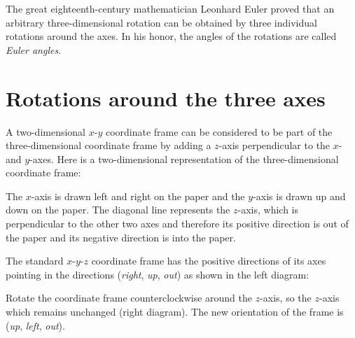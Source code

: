 \documentclass[11pt,a4paper]{report}
\begin{document}
The great eighteenth-century mathematician Leonhard Euler proved that an arbitrary three-dimensional rotation can be obtained by three individual rotations around the axes. In his honor, the angles of the rotations are called \emph{Euler angles}. 

\section{Rotations around the three axes}

A two-dimensional $x$-$y$ coordinate frame can be considered to be part of the three-dimensional coordinate frame by adding a $z$-axis perpendicular to the $x$- and $y$-axes. Here is a two-dimensional representation of the three-dimensional coordinate frame:
\begin{center}
\end{center}
The $x$-axis is drawn left and right on the paper and the $y$-axis is drawn up and down on the paper. The diagonal line represents the $z$-axis, which is perpendicular to the other two axes and therefore its positive direction is out of the paper and its negative direction is into the paper.

The standard $x$-$y$-$z$ coordinate frame has the positive directions of its axes pointing in the directions (\textit{right}, \textit{up}, \textit{out}) as shown in the left diagram:
\begin{center}
\hspace{3em}
\end{center}
Rotate the coordinate frame counterclockwise around the $z$-axis, so the $z$-axis which remains unchanged (right diagram). The new orientation of the frame is (\textit{up}, \textit{left}, \textit{out}).
\end{document}

